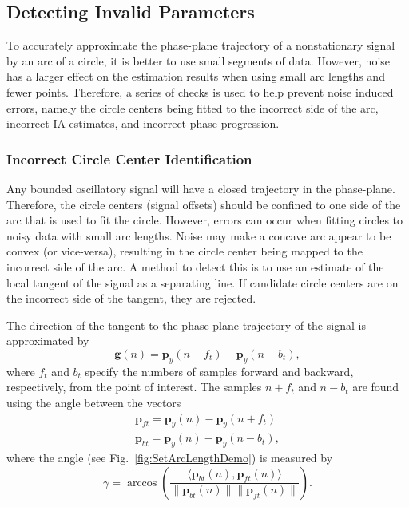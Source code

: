 \documentclass[a4paper]{IEEEtran}
\begin{document}
\subsection{Detecting Invalid Parameters}\label{sect:DetectingInvalidParameters}
To accurately approximate the phase-plane trajectory of a nonstationary signal by an arc of a circle, it is better to use small segments of data. However, noise has a larger effect on the estimation results when using small arc lengths and fewer points. Therefore, a series of checks is used to help prevent noise induced errors, namely the circle centers being fitted to the incorrect side of the arc, incorrect IA estimates, and incorrect phase progression. 

\subsubsection{Incorrect Circle Center Identification}
Any bounded oscillatory signal will have a closed trajectory in the phase-plane. Therefore, the circle centers (signal offsets) should be confined to one side of the arc that is used to fit the circle. However, errors can occur when fitting circles to noisy data with small arc lengths. Noise may make a concave arc appear to be convex (or vice-versa), resulting in the circle center being mapped to the incorrect side of the arc. A method to detect this is to use an estimate of the local tangent of the signal as a separating line. If candidate circle centers are on the incorrect side of the tangent, they are rejected. 

The direction of the tangent to the phase-plane trajectory of the signal is approximated by 
\begin{equation}
	\mathbf{g}(n) = \mathbf{p}_y(n + f_t) - \mathbf{p}_y(n - b_t),
\end{equation}
where $f_t$ and $b_t$ specify the numbers of samples forward and backward, respectively, from the point of interest. The samples $n + f_t$ and $n-b_t$ are found using the angle between the vectors
\begin{align}
	\mathbf{p}_{ft} = \mathbf{p}_y(n) - \mathbf{p}_y(n + f_t) \\
	\mathbf{p}_{bt} = \mathbf{p}_y(n) - \mathbf{p}_y(n - b_t),
\end{align}
where the angle (see Fig.~\ref{fig:SetArcLengthDemo}) is measured by
\begin{equation}\label{eq:TangentArcLength}
	\gamma = \arccos\left(\frac{\langle\mathbf{p}_{bt}(n),\mathbf{p}_{ft}(n)\rangle}{\|\mathbf{p}_{bt}(n)\| \|\mathbf{p}_{ft}(n)\|}\right).
\end{equation}
\end{document}
